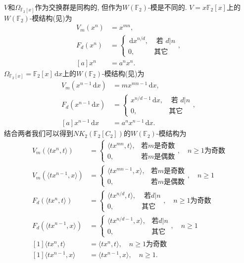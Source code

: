 $V$和$\Omega_{\mathbb{F}_2[x]}$作为交换群是同构的, 但作为$W(\mathbb{F}_2)$-模是不同的. $V=x \mathbb{F}_2[x]$上的$W(\mathbb{F}_2)$-模结构(见\cite{MR96j:16008})为 
\begin{align*}
 V_m(x^n)&=x^{mn}, \\
 F_d(x^n)&=\begin{cases}
 	\, \mathrm{d} x^{n/d}, & \mbox{ 若 $d|n$}\\
 	0, & \mbox{其它}
 \end{cases}, \\
 [a]x^n&=a^nx^n. 
 \end{align*}
$\Omega_{\mathbb{F}_2[x]}=\mathbb{F}_2[x]\, \mathrm{d} x $上的$W(\mathbb{F}_2)$-模结构(见\cite{MR96j:16008})为
\begin{align*}
 V_m(x^{n-1}\, \mathrm{d} x)&=mx^{mn-1}\, \mathrm{d} x, \\
 F_d(x^{n-1}\, \mathrm{d} x)&=\begin{cases}
 	x^{n/d-1}\, \mathrm{d} x, & \mbox{ 若 $d|n$}\\
 	0, & \mbox{其它}
 \end{cases}, \\
 [a]x^{n-1}\, \mathrm{d} x&=a^nx^{n-1}\, \mathrm{d} x. 
 \end{align*}
结合两者我们可以得到$NK_2(\mathbb{F}_2[C_2])$的$W(\mathbb{F}_2)$-模结构为
\begin{align*}
 V_m(\langle tx^n, t \rangle)&=\begin{cases}
 	\langle tx^{mn}, t \rangle, & \mbox{若$m$是奇数}\\
 	0, & \mbox{若$m$是偶数}
 \end{cases}, \quad \mbox{$n\geq 1$为奇数} \\
  V_m(\langle tx^{n-1}, x \rangle)&=\begin{cases}
 	\langle tx^{mn-1}, x \rangle, & \mbox{若$m$是奇数}\\
 	0, & \mbox{若$m$是偶数}
 \end{cases}
 , \quad \mbox{$n\geq 1$} \\
 F_d(\langle tx^n, t \rangle)&=\begin{cases}
 	\langle tx^{n/d}, t \rangle, & \mbox{ 若$d|n$}\\
 	0, & \mbox{其它}
 \end{cases}, \quad \mbox{$n\geq 1$为奇数} \\
 F_d(\langle tx^{n-1}, x \rangle)&=\begin{cases}
 	\langle tx^{n/d-1}, x \rangle, & \mbox{若$d|n$}\\
 	0, & \mbox{其它}
 \end{cases}
 , \quad \mbox{$n\geq 1$} \\
 [1]\langle tx^n, t \rangle&=\langle tx^n, t \rangle, \quad \mbox{$n\geq 1$为奇数} \\
 [1]\langle tx^{n-1}, x \rangle&=\langle tx^{n-1}, x \rangle, \quad \mbox{$n\geq 1$}. 
 \end{align*}



